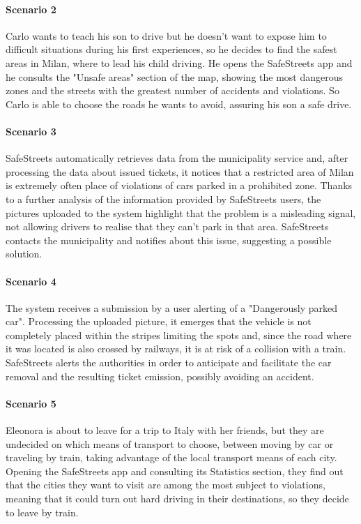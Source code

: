 \paragraph{Scenario 2}
\label{scenario:2}
	Carlo wants to teach his son to drive but he doesn't want to expose him to difficult situations during his first experiences, so he decides to find the safest areas in Milan, where to lead his child driving. He opens the SafeStreets app and he consults the "Unsafe areas" section of the map, showing the most dangerous zones and the streets with the greatest number of accidents and violations. So Carlo is able to choose the roads he wants to avoid, assuring his son a safe drive.

\paragraph{Scenario 3}
\label{scenario:3}
	SafeStreets automatically retrieves data from the municipality service and, after processing the data about issued tickets, it notices that a restricted area of Milan is extremely often place of violations of cars parked in a prohibited zone. Thanks to a further analysis of the information provided by SafeStreets users, the pictures uploaded to the system highlight that the problem is a misleading signal, not allowing drivers to realise that they can't park in that area. SafeStreets contacts the municipality and notifies about this issue, suggesting a possible solution.

\paragraph{Scenario 4}
\label{scenario:4}
	The system receives a submission by a user alerting of a "Dangerously parked car". Processing the uploaded picture, it emerges that the vehicle is not completely placed within the stripes limiting the spots and, since the road where it was located is also crossed by railways, it is at risk of a collision with a train. SafeStreets alerts the authorities in order to anticipate and facilitate the car removal and the resulting ticket emission, possibly avoiding an accident.	
	
\paragraph{Scenario 5}
\label{scenario:5}
	Eleonora is about to leave for a trip to Italy with her friends, but they are undecided on which means of transport to choose, between moving by car or traveling by train, taking advantage of the local transport means of each city. Opening the SafeStreets app and consulting its Statistics section, they find out that the cities they want to visit are among the most subject to violations, meaning that it could turn out hard driving in their destinations, so they decide to leave by train.
	
